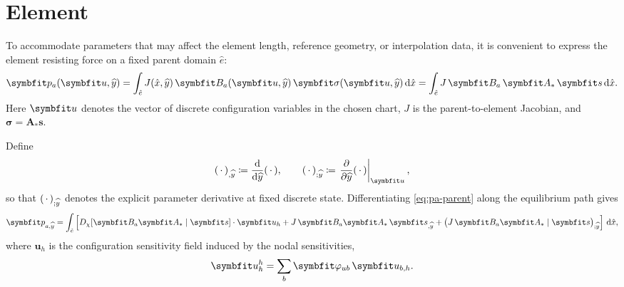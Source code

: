 
\section{Element}

To accommodate parameters that may affect the element length, reference geometry, or interpolation data, it is convenient to express the element resisting force on a fixed parent domain \(\hat e\):
\begin{equation}
\bm{p}_a(\ModelState,\HostParameter)
=
\int_{\hat e}
J(\hat{\reflenx},\HostParameter)\,\bm{B}_a(\ModelState,\HostParameter)\,\bm{\sigma}(\ModelState,\HostParameter)\,\dd\hat{\reflenx}
=
\int_{\hat e}
J\,\bm{B}_a\,\bm{A}_*\,\bm{s}\,\dd\hat{\reflenx} .
\label{eq:pa-parent}
\end{equation}
Here \(\ModelState\) denotes the vector of discrete configuration variables in the chosen chart, \(J\) is the parent-to-element Jacobian, and \(\bm{\sigma}=\bm{A}_*\bm{s}\).

Define
\begin{equation}
(\,\cdot\,)_{,\HostParameter} \coloneq \frac{\dd}{\dd \HostParameter}(\,\cdot\,),
\qquad
(\,\cdot\,)_{;\HostParameter}
\coloneq
\left.\frac{\partial}{\partial \HostParameter}(\,\cdot\,)\right|_{\ModelState},
\label{eq:def-direct-h}
\end{equation}
so that \((\,\cdot\,)_{;\widehat{y}}\) denotes the explicit parameter derivative at fixed discrete state. Differentiating \eqref{eq:pa-parent} along the equilibrium path gives
\begin{equation}
\bm{p}_{a,\HostParameter}
=
\int_{\hat e}
\left[
D_\chi[\bm{B}_a\bm{A}_*\mid\bm{s}] \cdot \bm{u}_h
+
J\,\bm{B}_a\bm{A}_*\,\bm{s}_{,\HostParameter}
+
\bigl(J\,\bm{B}_a\bm{A}_*\mid\bm{s}\bigr)_{;\HostParameter}
\right]\,\dd\hat{\reflenx} ,
\label{eq:pa-h-raw}
\end{equation}
where \(\bm{u}_h\) is the configuration sensitivity field induced by the nodal sensitivities,
\begin{equation}
\bm{u}_h^h
=
\sum_b \bm{\varphi}_{u b}\,\ModelState_{b,h}.
\label{eq:uh-field}
\end{equation}

